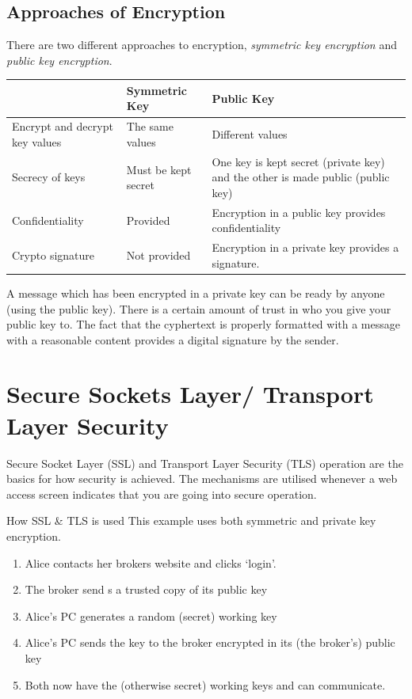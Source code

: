 \subsection*{Approaches of Encryption}
There are two different approaches to encryption, \textit{symmetric key encryption} and \textit{public key encryption}.
\begin{table}[H]
    \centering
    \begin{tabular}{p{} p{} p{}}
        & \textbf{Symmetric Key} & \textbf{Public Key}\\
        \hline
        \hline
        Encrypt and decrypt key values & The same values & Different values\\
        \hline
        Secrecy of keys & Must be kept secret & One key is kept secret (private key) and the other is made public (public key)\\
        \hline
        Confidentiality & Provided & Encryption in a public key provides confidentiality\\
        \hline
        Crypto signature & Not provided & Encryption in a private key provides a signature.\\
        \hline 
    \end{tabular}
\end{table}

A message which has been encrypted in a private key can be ready by anyone (using the public key). There is a certain amount of trust in who you give your public key to. The fact that the cyphertext is properly formatted with a message with a reasonable content provides a digital signature by the sender. 

\section*{Secure Sockets Layer/ Transport Layer Security}
Secure Socket Layer (SSL) and Transport Layer Security (TLS) operation are the basics for how security is achieved. The mechanisms are utilised whenever a web access screen indicates that you are going into secure operation.

\begin{example}{How SSL \& TLS is used}
This example uses both symmetric and private key encryption.
\begin{enumerate}
    \item Alice contacts her brokers website and clicks `login'.
    \item The broker send s a trusted copy of its public key
    \item Alice's PC generates a random (secret) working key
    \item Alice's PC sends the key to the broker encrypted in its (the broker's) public key
    \item Both now have the (otherwise secret) working keys and can communicate.
\end{enumerate}
\end{example}

